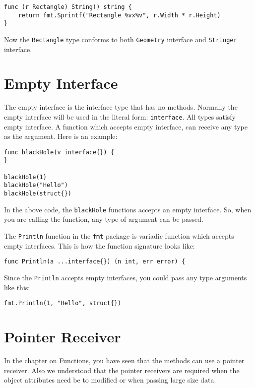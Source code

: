\begin{lstlisting}[numbers=none]
func (r Rectangle) String() string {
    return fmt.Sprintf("Rectangle %vx%v", r.Width * r.Height)
}
\end{lstlisting}

Now the \texttt{Rectangle} type conforms to both \texttt{Geometry}
interface and \texttt{Stringer} interface.

\section{Empty Interface}

The empty interface is the interface type that
has no methods.  Normally the empty interface will be used in the
literal form: \texttt{interface{}}.  All types satisfy empty interface.
A function which accepts empty interface, can receive any type as the
argument.  Here is an example:

\begin{lstlisting}[numbers=none]
func blackHole(v interface{}) {
}

blackHole(1)
blackHole("Hello")
blackHole(struct{})
\end{lstlisting}

In the above code, the \texttt{blackHole} functions accepts an empty
interface. So, when you are calling the function, any type of argument
can be passed.

The \texttt{Println} function in the \texttt{fmt} package is variadic
function which accepts empty interfaces.  This is how the function
signature looks like:

\begin{lstlisting}[numbers=none]
func Println(a ...interface{}) (n int, err error) {
\end{lstlisting}

Since the \texttt{Println} accepts empty interfaces, you could pass
any type arguments like this:

\begin{lstlisting}[numbers=none]
fmt.Println(1, "Hello", struct{})
\end{lstlisting}

\section{Pointer Receiver}

In the chapter on Functions, you have seen that the methods can use a
pointer receiver.  Also we understood
that the pointer receivers are required when the object attributes
need be to modified or when passing large size data.

